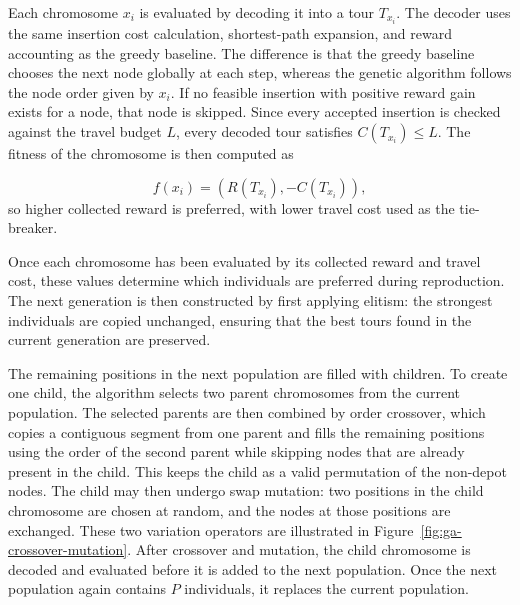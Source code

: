 \documentclass[report,english,cleveref,autoref,a4paper]{lipics-v2021}
\begin{document}
Each chromosome $x_i$ is evaluated by decoding it into a tour $T_{x_i}$. The
decoder uses the same insertion cost calculation, shortest-path expansion, and
reward accounting as the greedy baseline. The difference is that the greedy
baseline chooses the next node globally at each step, whereas the genetic
algorithm follows the node order given by $x_i$. If no feasible insertion with
positive reward gain exists for a node, that node is skipped. Since every
accepted insertion is checked against the travel budget $L$, every decoded tour
satisfies $C(T_{x_i}) \leq L$. The fitness of the chromosome is then computed as

\[
    f(x_i) = (R(T_{x_i}), -C(T_{x_i})),
\]
so higher collected reward is preferred, with lower travel cost used as the
tie-breaker.

Once each chromosome has been evaluated by its collected reward and travel cost, 
these values determine which individuals are preferred during reproduction. 
The next generation is then constructed by first applying elitism: the strongest 
individuals are copied unchanged, ensuring that the best tours found in the 
current generation are preserved.

The remaining positions in the next population are filled with children. To
create one child, the algorithm selects two parent chromosomes from the current population.
The selected parents are then combined by order crossover, which
copies a contiguous segment from one parent and fills the remaining positions
using the order of the second parent while skipping nodes that are already
present in the child. This keeps the child as a valid permutation of the
non-depot nodes. The child may then undergo swap mutation: two positions in the
child chromosome are chosen at random, and the nodes at those positions are
exchanged. These two variation operators are illustrated in
Figure~\ref{fig:ga-crossover-mutation}. After crossover and mutation, the child
chromosome is decoded and evaluated before it is added to the next population.
Once the next population again contains $P$ individuals, it replaces the current
population.

\end{document}

